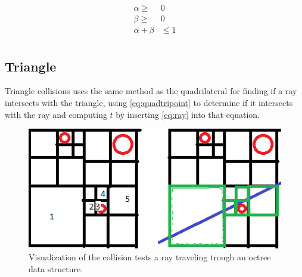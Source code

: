 \documentclass[a4paper, 12pt]{report}
\begin{document}
\begin{subequations} \label{eq:quadtrirange}
\begin{align}
\alpha \ge& 0\\
\beta \ge& 0\\
\alpha + \beta& \le 1\\
\end{align}
\end{subequations}

\subsection{Triangle}
Triangle collisions uses the same method as the quadrilateral for finding if a ray intersects with the triangle, using \autoref{eq:quadtripoint} to determine if it intersects with the ray and computing $t$ by inserting \autoref{eq:ray} into that equation.


\begin{figure}
	\centering
	\includegraphics[width=\textwidth]{figures/octreetwod.png}
	\caption{Visualization of the collision tests a ray traveling trough an octree data structure.}
	\label{fig:octreetraversal}
\end{figure}
\end{document}
